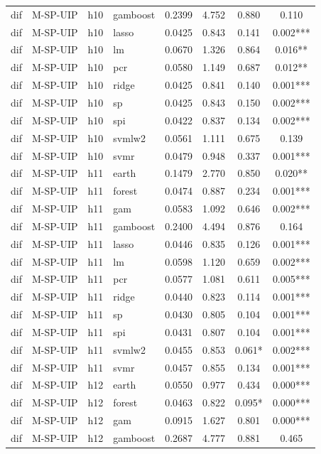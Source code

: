 \begin{ThreePartTable}
\begin{longtable}[t]{llclcccc}
dif & M-SP-UIP & h10 & gamboost & 0.2399 & 4.752 & 0.880 & 0.110\\
dif & M-SP-UIP & h10 & lasso & 0.0425 & 0.843 & 0.141 & 0.002***\\
dif & M-SP-UIP & h10 & lm & 0.0670 & 1.326 & 0.864 & 0.016**\\
dif & M-SP-UIP & h10 & pcr & 0.0580 & 1.149 & 0.687 & 0.012**\\
dif & M-SP-UIP & h10 & ridge & 0.0425 & 0.841 & 0.140 & 0.001***\\
dif & M-SP-UIP & h10 & sp & 0.0425 & 0.843 & 0.150 & 0.002***\\
dif & M-SP-UIP & h10 & spi & 0.0422 & 0.837 & 0.134 & 0.002***\\
dif & M-SP-UIP & h10 & svmlw2 & 0.0561 & 1.111 & 0.675 & 0.139\\
dif & M-SP-UIP & h10 & svmr & 0.0479 & 0.948 & 0.337 & 0.001***\\
\addlinespace
dif & M-SP-UIP & h11 & earth & 0.1479 & 2.770 & 0.850 & 0.020**\\
dif & M-SP-UIP & h11 & forest & 0.0474 & 0.887 & 0.234 & 0.001***\\
dif & M-SP-UIP & h11 & gam & 0.0583 & 1.092 & 0.646 & 0.002***\\
dif & M-SP-UIP & h11 & gamboost & 0.2400 & 4.494 & 0.876 & 0.164\\
dif & M-SP-UIP & h11 & lasso & 0.0446 & 0.835 & 0.126 & 0.001***\\
dif & M-SP-UIP & h11 & lm & 0.0598 & 1.120 & 0.659 & 0.002***\\
dif & M-SP-UIP & h11 & pcr & 0.0577 & 1.081 & 0.611 & 0.005***\\
dif & M-SP-UIP & h11 & ridge & 0.0440 & 0.823 & 0.114 & 0.001***\\
dif & M-SP-UIP & h11 & sp & 0.0430 & 0.805 & 0.104 & 0.001***\\
dif & M-SP-UIP & h11 & spi & 0.0431 & 0.807 & 0.104 & 0.001***\\
dif & M-SP-UIP & h11 & svmlw2 & 0.0455 & 0.853 & 0.061* & 0.002***\\
dif & M-SP-UIP & h11 & svmr & 0.0457 & 0.855 & 0.134 & 0.001***\\
\addlinespace
dif & M-SP-UIP & h12 & earth & 0.0550 & 0.977 & 0.434 & 0.000***\\
dif & M-SP-UIP & h12 & forest & 0.0463 & 0.822 & 0.095* & 0.000***\\
dif & M-SP-UIP & h12 & gam & 0.0915 & 1.627 & 0.801 & 0.000***\\
dif & M-SP-UIP & h12 & gamboost & 0.2687 & 4.777 & 0.881 & 0.465\\

\end{longtable}
\end{ThreePartTable}
